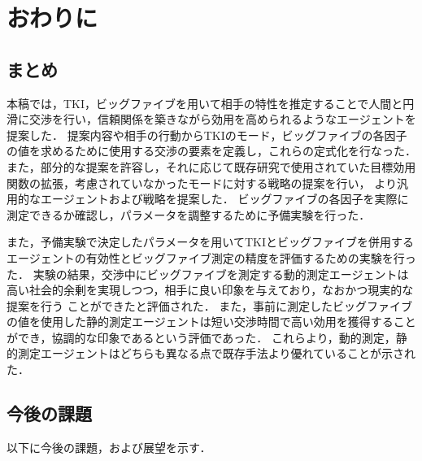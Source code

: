 

\chapter{おわりに}
\section{まとめ}
本稿では，TKI，ビッグファイブを用いて相手の特性を推定することで人間と円滑に交渉を行い，信頼関係を築きながら効用を高められるようなエージェントを提案した．
提案内容や相手の行動からTKIのモード，ビッグファイブの各因子の値を求めるために使用する交渉の要素を定義し，これらの定式化を行なった．
また，部分的な提案を許容し，それに応じて既存研究で使用されていた目標効用関数の拡張，考慮されていなかったモードに対する戦略の提案を行い，
より汎用的なエージェントおよび戦略を提案した．
ビッグファイブの各因子を実際に測定できるか確認し，パラメータを調整するために予備実験を行った．

また，予備実験で決定したパラメータを用いてTKIとビッグファイブを併用するエージェントの有効性とビッグファイブ測定の精度を評価するための実験を行った．
実験の結果，交渉中にビッグファイブを測定する動的測定エージェントは高い社会的余剰を実現しつつ，相手に良い印象を与えており，なおかつ現実的な提案を行う
ことができたと評価された．
また，事前に測定したビッグファイブの値を使用した静的測定エージェントは短い交渉時間で高い効用を獲得することができ，協調的な印象であるという評価であった．
これらより，動的測定，静的測定エージェントはどちらも異なる点で既存手法より優れていることが示された．

\section{今後の課題}
以下に今後の課題，および展望を示す．

